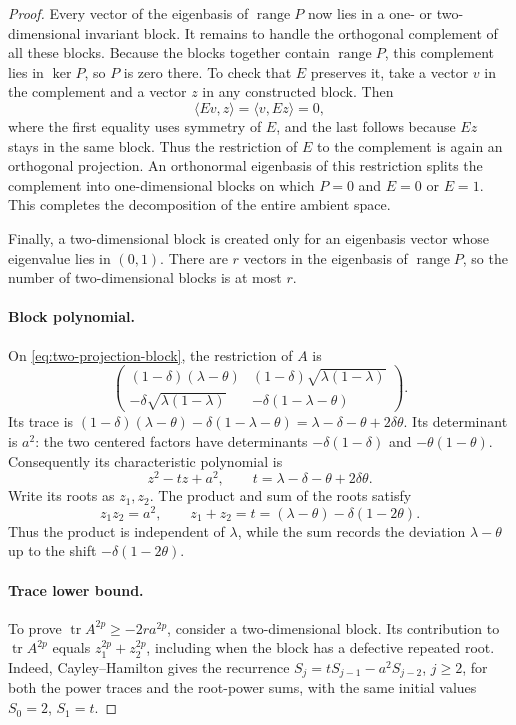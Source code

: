 \documentclass[11pt]{article}
\theoremstyle{definition}
\theoremstyle{remark}
\theoremstyle{plain}
\DeclareMathOperator{\tr}{tr}
\begin{document}
\begin{proof}
Every vector of the eigenbasis of
\(\operatorname{range}P\) now lies in a one- or two-dimensional invariant block.
It remains to handle the orthogonal complement of all these blocks.
Because the blocks together contain \(\operatorname{range}P\),
this complement lies in \(\ker P\), so \(P\) is zero there.
To check that \(E\) preserves it, take a vector \(v\) in the complement
and a vector \(z\) in any constructed block. Then
\[
 \langle Ev,z\rangle=\langle v,Ez\rangle=0,
\]
where the first equality uses symmetry of \(E\), and the last
follows because \(Ez\) stays in the same block.
Thus the restriction of \(E\) to the complement is again an
orthogonal projection. An orthonormal eigenbasis of this restriction
splits the complement into one-dimensional blocks on which \(P=0\)
and \(E=0\) or \(E=1\). This completes the decomposition of the
entire ambient space.

Finally, a two-dimensional block is created only for an eigenbasis
vector whose eigenvalue lies in \((0,1)\). There are \(r\) vectors
in the eigenbasis of \(\operatorname{range}P\), so the number of
two-dimensional blocks is at most \(r\).

\paragraph{Block polynomial.}
On \eqref{eq:two-projection-block}, the restriction of \(A\) is
\[
 \begin{pmatrix}
 (1-\delta)(\lambda-\theta)&
       (1-\delta)\sqrt{\lambda(1-\lambda)}\\
 -\delta\sqrt{\lambda(1-\lambda)}&
       -\delta(1-\lambda-\theta)
 \end{pmatrix}.
\]
Its trace is
\((1-\delta)(\lambda-\theta)-\delta(1-\lambda-\theta)
=\lambda-\delta-\theta+2\delta\theta\).
Its determinant is \(a^2\): the two centered factors have
determinants \(-\delta(1-\delta)\) and \(-\theta(1-\theta)\).
Consequently its characteristic polynomial is
\begin{equation}\label{eq:block-polynomial}
 z^2-tz+a^2,\qquad t=\lambda-\delta-\theta+2\delta\theta.
\end{equation}
Write its roots as \(z_1,z_2\). The product and sum of the roots satisfy
\[
 z_1z_2=a^2,\qquad
 z_1+z_2=t=(\lambda-\theta)-\delta(1-2\theta).
\]
Thus the product is independent of \(\lambda\), while the sum records
the deviation \(\lambda-\theta\) up to the shift
\(-\delta(1-2\theta)\).

\paragraph{Trace lower bound.}
To prove \(\tr A^{2p}\ge-2ra^{2p}\), consider a two-dimensional
block. Its contribution to \(\tr A^{2p}\) equals
\(z_1^{2p}+z_2^{2p}\), including when the block has a defective
repeated root. Indeed, Cayley--Hamilton gives the recurrence
\(S_j=tS_{j-1}-a^2S_{j-2}\), \(j\ge2\), for both the power traces
and the root-power sums, with the same initial values
\(S_0=2\), \(S_1=t\).


\end{proof}
\end{document}

